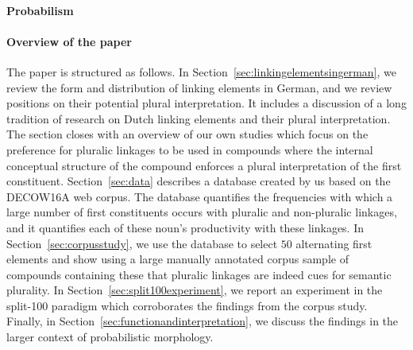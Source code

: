 \paragraph{Probabilism}

\paragraph{Overview of the paper}

The paper is structured as follows.
In Section~\ref{sec:linkingelementsingerman}, we review the form and distribution of linking elements in German, and we review positions on their potential plural interpretation.
It includes a discussion of a long tradition of research on Dutch linking elements and their plural interpretation.
The section closes with an overview of our own studies which focus on the preference for pluralic linkages to be used in compounds where the internal conceptual structure of the compound enforces a plural interpretation of the first constituent.
Section~\ref{sec:data} describes a database created by us based on the DECOW16A web corpus.
The database quantifies the frequencies with which a large number of first constituents occurs with pluralic and non-pluralic linkages, and it quantifies each of these noun's productivity with these linkages.
In Section~\ref{sec:corpusstudy}, we use the database to select $50$ alternating first elements and show using a large manually annotated corpus  sample of compounds containing these that pluralic linkages are indeed cues for semantic plurality.
In Section~\ref{sec:split100experiment}, we report an experiment in the split-100 paradigm which corroborates the findings from the corpus study.
Finally, in Section~\ref{sec:functionandinterpretation}, we discuss the findings in the larger context of probabilistic morphology.
